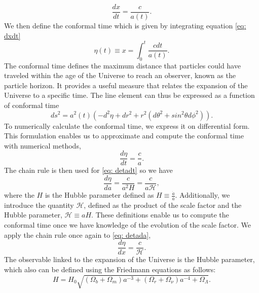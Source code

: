 \documentclass{aa}
\begin{document}
\begin{equation}\label{eq: dxdt}
    \frac{dx}{dt} = \frac{c}{a(t)}.
\end{equation}
We then define the conformal time which is given by integrating
equation \eqref{eq: dxdt}
\begin{equation}\label{eq: eta}
    \eta(t) \equiv x = \int_0^{t} \frac{c dt}{a(t)}.
\end{equation}
The conformal time defines the maximum distance that particles could have traveled within the age of the Universe to reach an observer, known as the particle horizon. It provides a useful measure that relates the expansion of the Universe to a specific time. The line element can thus be expressed as a function of conformal time
\begin{equation}\label{eq: ds_eta}
    ds^2 = a^2(t) \left( -d^2\eta + dr^2 + r^2(d\theta^2 + sin^2\theta
    d\phi^2) \right).
\end{equation}
To numerically calculate the conformal time, we express it on differential form. This formulation enables us to approximate and compute the conformal time with numerical methods,
\begin{equation}\label{eq: detadt}
    \frac{d\eta}{dt} = \frac{c}{a}.
\end{equation}
The chain rule is then used for \eqref{eq: detadt} so we have
\begin{equation}\label{eq: detada}
    \frac{d \eta}{da} = \frac{c}{a^2 H} = \frac{c}{a \mathcal{H}},
\end{equation}
where the $H$ is the Hubble parameter defined as $H \equiv \frac{\Dot{a}}{a}$. Additionally, we introduce the quantity $\mathcal{H}$, defined as the product of the scale factor and the Hubble parameter, $\mathcal{H} \equiv aH$. These definitions enable us to compute the conformal time once we have knowledge of the evolution of the scale factor. We apply the chain rule once again to \eqref{eq: detada},
\begin{equation}\label{eq: detadx}
    \frac{d \eta}{dx} = \frac{c}{\mathcal{H}}.
\end{equation}
The observable linked to the expansion of the Universe is the Hubble parameter, which also can be defined using the Friedmann equations as follows:
\begin{equation}\label{eq:Friedmann}
    H = H_0 \sqrt{(\Omega_b + \Omega_m)a^{-3} + (\Omega_r +
    \Omega_\nu)a^{-4} +\Omega_\Lambda}.
\end{equation}
\end{document}
